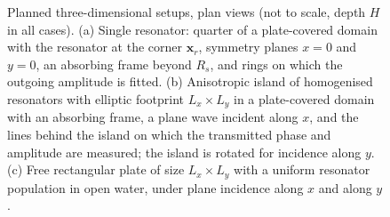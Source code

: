 \begin{figure}[t]
    \caption{Planned three-dimensional setups, plan views (not to scale, depth $H$ in all cases). (a) Single resonator: quarter of a plate-covered domain with the resonator at the corner $\boldsymbol{x}_r$, symmetry planes $x=0$ and $y=0$, an absorbing frame beyond $R_s$, and rings on which the outgoing amplitude is fitted. (b) Anisotropic island of homogenised resonators with elliptic footprint $L_x\times L_y$ in a plate-covered domain with an absorbing frame, a plane wave incident along $x$, and the lines behind the island on which the transmitted phase and amplitude are measured; the island is rotated for incidence along $y$. (c) Free rectangular plate of size $L_x\times L_y$ with a uniform resonator population in open water, under plane incidence along $x$ and along $y$.}
    \label{fig:num_sketch_3D_planned}
\end{figure}
